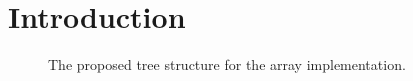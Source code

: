 %
%
\chapter{Introduction}

\begin{figure}[!h]
	\centering
	\caption{The proposed tree structure for the array implementation.}
\end{figure}


\clearpage